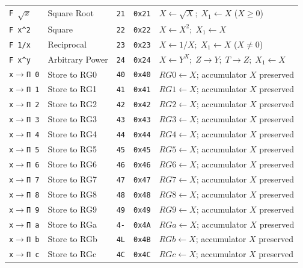 \documentclass[11pt,a4paper]{article}
\begin{document}
{\begin{longtable}{p{2.2cm}p{3.0cm}>{\centering\arraybackslash}p{1.0cm}>{\centering\arraybackslash}p{1.2cm}p{7.3cm}}
\texttt{F $\sqrt{x}$} & Square Root & \texttt{21} & \texttt{0x21} & $X \leftarrow \sqrt{X};\; X_1 \leftarrow X$ ($X \ge 0$) \\
\texttt{F x\textasciicircum 2} & Square & \texttt{22} & \texttt{0x22} & $X \leftarrow X^2;\; X_1 \leftarrow X$ \\
\texttt{F 1/x} & Reciprocal & \texttt{23} & \texttt{0x23} & $X \leftarrow 1/X;\; X_1 \leftarrow X$ ($X \ne 0$) \\
\texttt{F x\textasciicircum y} & Arbitrary Power & \texttt{24} & \texttt{0x24} & $X \leftarrow Y^X;\; Z \to Y;\; T \to Z;\; X_1 \leftarrow X$ \\
\midrule
\texttt{x$\to$П 0} & Store to RG0 & \texttt{40} & \texttt{0x40} & $RG0 \leftarrow X$; accumulator $X$ preserved \\
\texttt{x$\to$П 1} & Store to RG1 & \texttt{41} & \texttt{0x41} & $RG1 \leftarrow X$; accumulator $X$ preserved \\
\texttt{x$\to$П 2} & Store to RG2 & \texttt{42} & \texttt{0x42} & $RG2 \leftarrow X$; accumulator $X$ preserved \\
\texttt{x$\to$П 3} & Store to RG3 & \texttt{43} & \texttt{0x43} & $RG3 \leftarrow X$; accumulator $X$ preserved \\
\texttt{x$\to$П 4} & Store to RG4 & \texttt{44} & \texttt{0x44} & $RG4 \leftarrow X$; accumulator $X$ preserved \\
\texttt{x$\to$П 5} & Store to RG5 & \texttt{45} & \texttt{0x45} & $RG5 \leftarrow X$; accumulator $X$ preserved \\
\texttt{x$\to$П 6} & Store to RG6 & \texttt{46} & \texttt{0x46} & $RG6 \leftarrow X$; accumulator $X$ preserved \\
\texttt{x$\to$П 7} & Store to RG7 & \texttt{47} & \texttt{0x47} & $RG7 \leftarrow X$; accumulator $X$ preserved \\
\texttt{x$\to$П 8} & Store to RG8 & \texttt{48} & \texttt{0x48} & $RG8 \leftarrow X$; accumulator $X$ preserved \\
\texttt{x$\to$П 9} & Store to RG9 & \texttt{49} & \texttt{0x49} & $RG9 \leftarrow X$; accumulator $X$ preserved \\
\texttt{x$\to$П a} & Store to RGa & \texttt{4-} & \texttt{0x4A} & $RGa \leftarrow X$; accumulator $X$ preserved \\
\texttt{x$\to$П b} & Store to RGb & \texttt{4L} & \texttt{0x4B} & $RGb \leftarrow X$; accumulator $X$ preserved \\
\texttt{x$\to$П c} & Store to RGc & \texttt{4C} & \texttt{0x4C} & $RGc \leftarrow X$; accumulator $X$ preserved \\

\end{longtable}}
\end{document}
